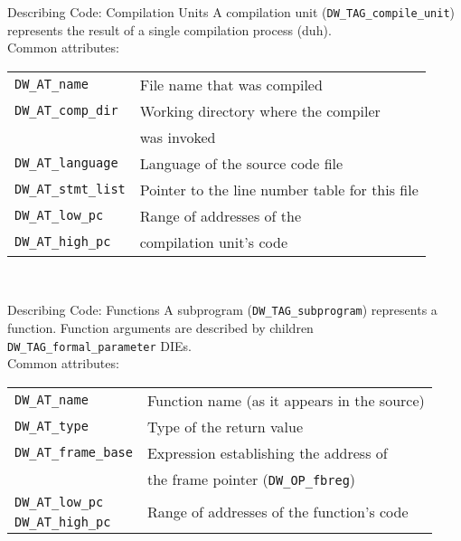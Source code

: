 \begin{frame}{Describing Code: Compilation Units}
A compilation unit (\texttt{DW\_TAG\_compile\_unit}) represents the result of a single compilation process (duh).\\
\medskip
Common attributes:\\
\medskip
\begin{tabular}{ l l }
\texttt{DW\_AT\_name} & File name that was compiled \\
\texttt{DW\_AT\_comp\_dir} & Working directory where the compiler\\
& was invoked \\
\texttt{DW\_AT\_language} & Language of the source code file \\
\texttt{DW\_AT\_stmt\_list} & Pointer to the line number table for this file \medskip \\

\texttt{DW\_AT\_low\_pc} & Range of addresses of the \\
\texttt{DW\_AT\_high\_pc} & compilation unit's code \\
\end{tabular}\\
\end{frame}


\begin{frame}{Describing Code: Functions}
A subprogram (\texttt{DW\_TAG\_subprogram}) represents a function. Function arguments are
described by children \texttt{DW\_TAG\_formal\_parameter} DIEs.\\
\medskip
Common attributes:\\
\medskip
\begin{tabular}{ l l }
\texttt{DW\_AT\_name} & Function name (as it appears in the source) \\
\texttt{DW\_AT\_type} & Type of the return value \\
\texttt{DW\_AT\_frame\_base} & Expression establishing the address of \\
& the frame pointer (\texttt{DW\_OP\_fbreg}) \\
\texttt{DW\_AT\_low\_pc} & \multirow{2}{*}{Range of addresses of the function's code} \\
\texttt{DW\_AT\_high\_pc} &  \\
\end{tabular}\\
\end{frame}


